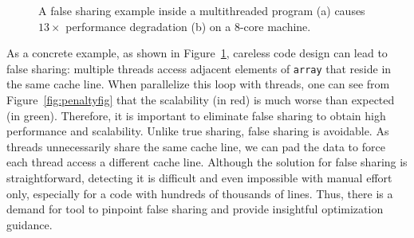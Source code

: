 
\begin{figure}[htbp]
\centering
{}%
\hspace{30pt}
\caption{
A false sharing example inside a multithreaded program (a) causes $13\times$ performance degradation (b) on a 8-core machine.
\label{fig:penalty}}
\end{figure}

As a concrete example, as shown in Figure~\ref{fig:penalty}, careless code design can lead to false sharing: multiple threads access adjacent elements of {\tt array} that reside in the same cache line. When parallelize this loop with threads, one can see from Figure~\ref{fig:penaltyfig} that the scalability (in red) is much worse than expected (in green). Therefore, it is important to eliminate false sharing to obtain high performance and scalability. 
Unlike true sharing, false sharing is avoidable. As threads unnecessarily share the same cache line, we can pad the data to force each thread access a different cache line. Although the solution for false sharing is straightforward, detecting it is difficult and even impossible with manual effort only, especially for a code with hundreds of thousands of lines. Thus, there is a demand for tool to pinpoint false sharing and provide insightful optimization guidance.


